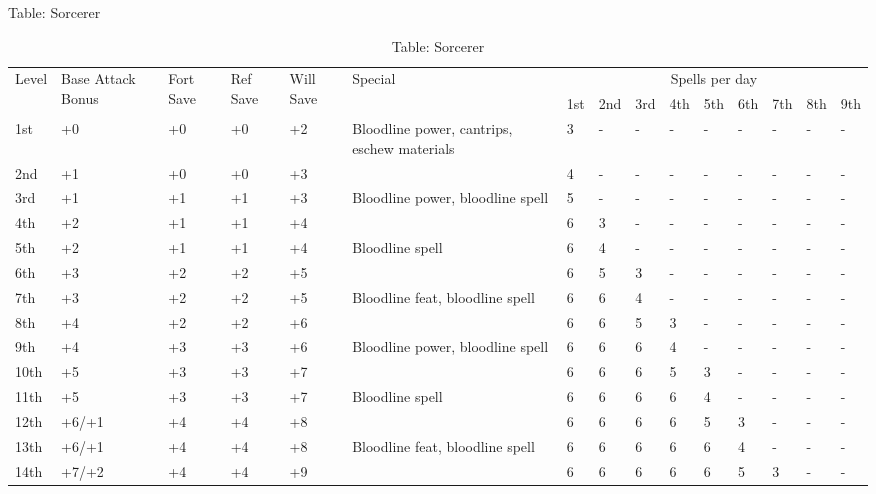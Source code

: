 Table: Sorcerer
\begin{table}[]
\caption{Table: Sorcerer}
\sffamily
\setlength{\tabcolsep}{1pt}
\begin{tabularx}{\linewidth}{lp{6em}p{2.5em}p{2.5em}p{2.5em}Xlllllllll}
\multirow{2}{*}{Level} & \multirow{2}{*}{\parbox{5em}{Base Attack Bonus}} & \multirow{2}{*}{\parbox{1.5em}{Fort Save}} & \multirow{2}{*}{\parbox{1.5em}{Ref Save}} & \multirow{2}{*}{\parbox{1.5em}{Will Save}} & Special                                                                                              & \multicolumn{9}{c}{Spells per day} \\
                       &                                    &                            &                           &                            &                                                                                                  & 1st & 2nd & 3rd & 4th & 5th & 6th & 7th & 8th & 9th \\
\hline
1st & +0 & +0 & +0 & +2 & Bloodline power, cantrips, eschew materials & 3 & - & - & - & - & - & - & - & -\\
2nd & +1 & +0 & +0 & +3 &  & 4 & - & - & - & - & - & - & - & -\\
3rd & +1 & +1 & +1 & +3 & Bloodline power, bloodline spell & 5 & - & - & - & - & - & - & - & -\\
4th & +2 & +1 & +1 & +4 &  & 6 & 3 & - & - & - & - & - & - & -\\
5th & +2 & +1 & +1 & +4 & Bloodline spell & 6 & 4 & - & - & - & - & - & - & -\\
6th & +3 & +2 & +2 & +5 &  & 6 & 5 & 3 & - & - & - & - & - & -\\
7th & +3 & +2 & +2 & +5 & Bloodline feat, bloodline spell & 6 & 6 & 4 & - & - & - & - & - & -\\
8th & +4 & +2 & +2 & +6 &  & 6 & 6 & 5 & 3 & - & - & - & - & -\\
9th & +4 & +3 & +3 & +6 & Bloodline power, bloodline spell & 6 & 6 & 6 & 4 & - & - & - & - & -\\
10th & +5 & +3 & +3 & +7 &  & 6 & 6 & 6 & 5 & 3 & - & - & - & -\\
11th & +5 & +3 & +3 & +7 & Bloodline spell & 6 & 6 & 6 & 6 & 4 & - & - & - & -\\
12th & +6/+1 & +4 & +4 & +8 &  & 6 & 6 & 6 & 6 & 5 & 3 & - & - & -\\
13th & +6/+1 & +4 & +4 & +8 & Bloodline feat, bloodline spell & 6 & 6 & 6 & 6 & 6 & 4 & - & - & -\\
14th & +7/+2 & +4 & +4 & +9 &  & 6 & 6 & 6 & 6 & 6 & 5 & 3 & - & -\\

\end{tabularx}
\end{table}
